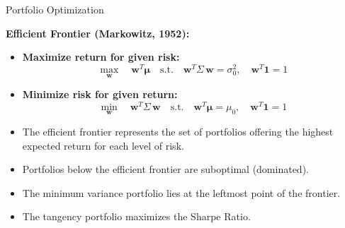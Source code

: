 \documentclass[9pt, aspectratio=169, t]{beamer}
\theoremstyle{definition}
\begin{document}
\begin{frame}{Portfolio Optimization}

\textbf{Efficient Frontier (Markowitz, 1952):}

\vspace{0.3cm}

\begin{itemize}
    \item \textbf{Maximize return for given risk:}
    \[
    \max_{\mathbf{w}} \quad \mathbf{w}^T \boldsymbol{\mu} \quad \text{s.t.} \quad \mathbf{w}^T \Sigma\, \mathbf{w} = \sigma_0^2, \quad \mathbf{w}^T \mathbf{1} = 1
    \]
    \item \textbf{Minimize risk for given return:}
    \[
    \min_{\mathbf{w}} \quad \mathbf{w}^T \Sigma\, \mathbf{w} \quad \text{s.t.} \quad \mathbf{w}^T \boldsymbol{\mu} = \mu_0, \quad \mathbf{w}^T \mathbf{1} = 1
    \]
\end{itemize}

\vspace{0.3cm}

\begin{itemize}
    \item The efficient frontier represents the set of portfolios offering the highest expected return for each level of risk.
    \item Portfolios below the efficient frontier are suboptimal (dominated).
    \item The minimum variance portfolio lies at the leftmost point of the frontier.
    \item The tangency portfolio maximizes the Sharpe Ratio.
\end{itemize}

\end{frame}
\end{document}

